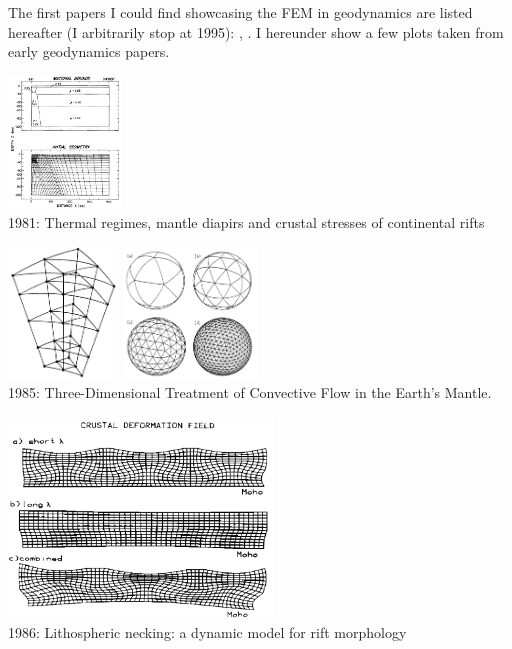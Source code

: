 
The first papers I could find showcasing the FEM in geodynamics are listed hereafter
(I arbitrarily stop at 1995):
\cite{gart78}, 
\cite{anbr80}\cite{mera80}\cite{bran80}
\cite{engl82}
\cite{thar85}
\cite{enho86}\cite{mofr86}
\cite{zupa86}
\cite{boww89}
\cite{brau94}
\cite{brbe95}.
I hereunder show a few plots taken from early geodynamics papers.


\begin{center}
\includegraphics[height=3.5cm]{images/history/brpo81}\\
{\scriptsize 1981: Thermal regimes, mantle diapirs and crustal stresses of continental rifts \cite{brpo81}}
\end{center}


\begin{center}
\begin{minipage}{0.45\textwidth}
\centering
\includegraphics[height=3.5cm]{images/history/baum85a}
\includegraphics[height=3.5cm]{images/history/baum85b}\\
{\scriptsize 1985: Three-Dimensional Treatment of Convective Flow in the Earth's Mantle.
\cite{baum85}}
\end{minipage}\hfill
\begin{minipage}{0.45\textwidth}
\centering
\includegraphics[width=7cm]{images/history/zupf86}\\
{\scriptsize 1986: Lithospheric necking: a dynamic model for rift morphology \cite{zupf86}}
\end{minipage}
\end{center}


